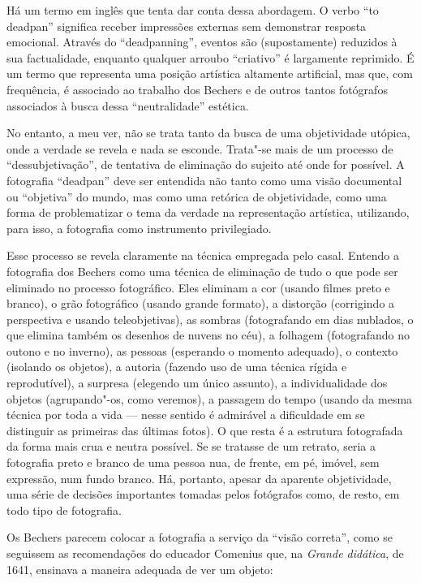 Há um termo em inglês que tenta dar conta dessa abordagem. O verbo ``to
deadpan'' significa receber impressões externas sem demonstrar resposta
emocional. Através do ``deadpanning'', eventos são (supostamente)
reduzidos à sua factualidade, enquanto qualquer arroubo ``criativo'' é
largamente reprimido. É um termo que representa uma posição artística
altamente artificial, mas que, com frequência, é associado ao trabalho
dos Bechers e de outros tantos fotógrafos associados à busca dessa
``neutralidade'' estética.

No entanto, a meu ver, não se trata tanto da busca de uma objetividade
utópica, onde a verdade se revela e nada se esconde. Trata"-se mais de um
processo de ``dessubjetivação'', de tentativa de eliminação do sujeito
até onde for possível. A fotografia ``deadpan'' deve ser entendida não
tanto como uma visão documental ou ``objetiva'' do mundo, mas como uma
retórica de objetividade, como uma forma de problematizar o tema da
verdade na representação artística, utilizando, para isso, a fotografia
como instrumento privilegiado.

Esse processo se revela claramente na técnica empregada pelo casal.
Entendo a fotografia dos Bechers como uma técnica de eliminação de tudo
o que pode ser eliminado no processo fotográfico. Eles eliminam a cor
(usando filmes preto e branco), o grão fotográfico (usando grande
formato), a distorção (corrigindo a perspectiva e usando teleobjetivas),
as sombras (fotografando em dias nublados, o que elimina também os
desenhos de nuvens no céu), a folhagem (fotografando no outono e no
inverno), as pessoas (esperando o momento adequado), o contexto
(isolando os objetos), a autoria (fazendo uso de uma técnica rígida e
reprodutível), a surpresa (elegendo um único assunto), a individualidade
dos objetos (agrupando"-os, como veremos), a passagem do tempo (usando da
mesma técnica por toda a vida --- nesse sentido é admirável a dificuldade
em se distinguir as primeiras das últimas fotos). O que resta é a
estrutura fotografada da forma mais crua e neutra possível. Se se
tratasse de um retrato, seria a fotografia preto e branco de uma pessoa
nua, de frente, em pé, imóvel, sem expressão, num fundo branco. Há,
portanto, apesar da aparente objetividade, uma série de decisões
importantes tomadas pelos fotógrafos como, de resto, em todo tipo de
fotografia.

Os Bechers parecem colocar a fotografia a serviço da ``visão correta'',
como se seguissem as recomendações do educador Comenius que, na
\emph{Grande didática}, de 1641, ensinava a maneira adequada de ver um
objeto:

